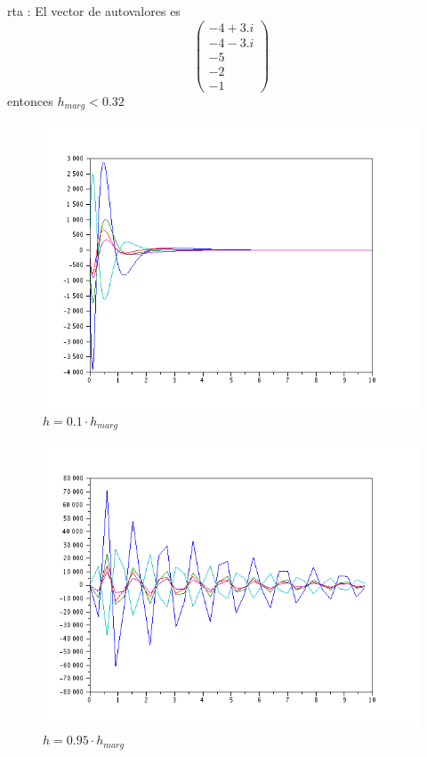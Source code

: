 \documentclass{article}
\begin{document}
\begin{itemize}
rta :
El vector de autovalores es 
\begin{equation*}
\begin{pmatrix}
  - 4 + 3.i  \\
  - 4 - 3.i  \\
  - 5        \\
  - 2        \\
  - 1   
	\end{pmatrix}
\end{equation*}
entonces $h_{marg} < 0.32$

\begin{figure}[H]
\includegraphics[width=\textwidth]{img/ej2-1-i.png}
\caption{$h=0.1 \cdot h_{marg}$}
\end{figure}

\begin{figure}[H]
\includegraphics[width=\textwidth]{img/ej2-1-ii.png}
\caption{$h=0.95 \cdot h_{marg}$}
\end{figure}


\end{itemize}
\end{document}
